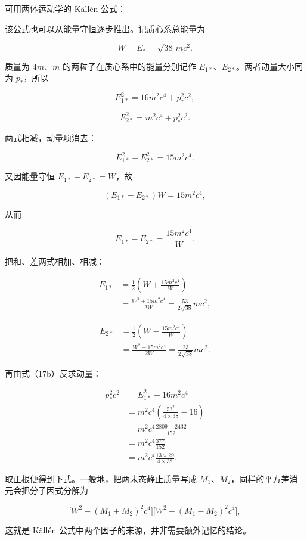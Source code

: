 \documentclass[12pt,a4paper,UTF8]{ctexart}
\begin{document}
可用两体运动学的 Källén 公式：

该公式也可以从能量守恒逐步推出。记质心系总能量为

\[
W=E_*=\sqrt{38}\,mc^2.
\tag{17a}
\]

质量为 \(4m\)、\(m\) 的两粒子在质心系中的能量分别记作
\(E_{1*}\)、\(E_{2*}\)。两者动量大小同为 \(p_*\)，所以

\[
E_{1*}^2=16m^2c^4+p_*^2c^2,
\tag{17b}
\]

\[
E_{2*}^2=m^2c^4+p_*^2c^2.
\tag{17c}
\]

两式相减，动量项消去：

\[
E_{1*}^2-E_{2*}^2=15m^2c^4.
\tag{17d}
\]

又因能量守恒 \(E_{1*}+E_{2*}=W\)，故

\[
(E_{1*}-E_{2*})W=15m^2c^4,
\tag{17e}
\]

从而

\[
E_{1*}-E_{2*}=\frac{15m^2c^4}{W}.
\tag{17f}
\]

把和、差两式相加、相减：

\[
\begin{aligned}
E_{1*}
&=\frac12\left(W+\frac{15m^2c^4}{W}\right)\\
&=\frac{W^2+15m^2c^4}{2W}
=\frac{53}{2\sqrt{38}}mc^2,
\end{aligned}
\tag{17g}
\]

\[
\begin{aligned}
E_{2*}
&=\frac12\left(W-\frac{15m^2c^4}{W}\right)\\
&=\frac{W^2-15m^2c^4}{2W}
=\frac{23}{2\sqrt{38}}mc^2.
\end{aligned}
\tag{17h}
\]

再由式（17b）反求动量：

\[
\begin{aligned}
p_*^2c^2
&=E_{1*}^2-16m^2c^4\\
&=m^2c^4\left(\frac{53^2}{4\times38}-16\right)\\
&=m^2c^4\frac{2809-2432}{152}\\
&=m^2c^4\frac{377}{152}\\
&=m^2c^4\frac{13\times29}{4\times38}.
\end{aligned}
\tag{17i}
\]

取正根便得到下式。一般地，把两末态静止质量写成
\(M_1\)、\(M_2\)，同样的平方差消元会把分子因式分解为

\[
\bigl[W^2-(M_1+M_2)^2c^4\bigr]
\bigl[W^2-(M_1-M_2)^2c^4\bigr],
\]

这就是 Källén 公式中两个因子的来源，并非需要额外记忆的结论。
\end{document}
